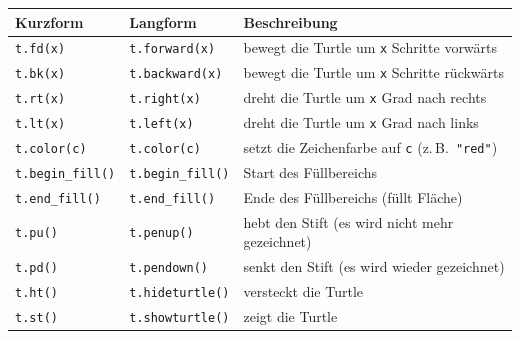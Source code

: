 \clearpage
\begin{myoverview}
	\leavevmode
	\begin{table}[H]
		\centering
		\begin{tabular}{lll}
			\midrule
			\textbf{Kurzform}            & \textbf{Langform}            & \textbf{Beschreibung}                                                                                   \\
			\midrule
			\lstinline|t.fd(x)|          & \lstinline|t.forward(x)|     & bewegt die Turtle um \lstinline|x| Schritte vorwärts                                                    \\
			\lstinline|t.bk(x)|          & \lstinline|t.backward(x)|    & bewegt die Turtle um \lstinline|x| Schritte rückwärts                                                   \\
			\lstinline|t.rt(x)|          & \lstinline|t.right(x)|       & dreht die Turtle um \lstinline|x| Grad nach rechts                                                      \\
			\lstinline|t.lt(x)|          & \lstinline|t.left(x)|        & dreht die Turtle um \lstinline|x| Grad nach links                                                       \\
			\lstinline|t.color(c)|       & \lstinline|t.color(c)|       & setzt die Zeichenfarbe auf \lstinline|c| (z.\,B.\ \lstinline|"red"|)                                    \\
			\lstinline|t.begin_fill()|   & \lstinline|t.begin_fill()|   & Start des Füllbereichs                                                                                  \\
			\lstinline|t.end_fill()|     & \lstinline|t.end_fill()|     & Ende des Füllbereichs (füllt Fläche)                                                                    \\
			\lstinline|t.pu()|           & \lstinline|t.penup()|        & hebt den Stift (es wird nicht mehr gezeichnet)                                                          \\
			\lstinline|t.pd()|           & \lstinline|t.pendown()|      & senkt den Stift (es wird wieder gezeichnet)                                                             \\
			\lstinline|t.ht()|           & \lstinline|t.hideturtle()|   & versteckt die Turtle                                                                                    \\
			\lstinline|t.st()|           & \lstinline|t.showturtle()|   & zeigt die Turtle                                                                                        \\

\end{tabular}
\end{table}
\end{myoverview}
